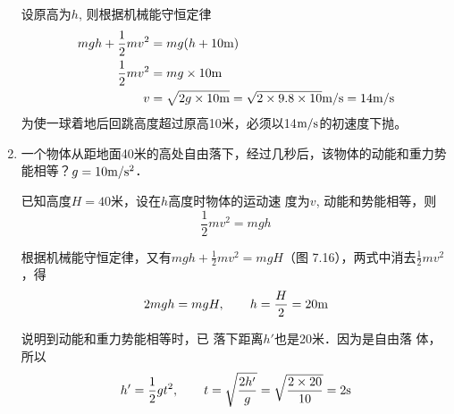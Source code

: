 \begin{enumerate}
\begin{solution}
    设原高为$h$, 则根据机械能守恒定律
   \[\begin{split}
       mgh+\frac{1}{2}mv^2&=mg(h+10{\rm m})\\
\frac{1}{2}mv^2&=mg\times 10{\rm m}\\
v&=\sqrt{2g\times 10{\rm m}}=\sqrt{2\times 9.8\times 10}\text{m}/\text{s}=14\text{m}/\text{s}
   \end{split} \]
    为使一球着地后回跳高度超过原高10米，必须以14$\text{m}/\text{s}$的初速度下抛。
\end{solution}
\item 一个物体从距地面40米的高处自由落下，经过几秒后，该物体的动能和重力势能相等？$g=10\text{m}/\text{s}^2$．

\begin{solution}
    已知高度$H=40$米，设在$h$高度时物体的运动速
    度为$v$, 动能和势能相等，则
    \[\frac{1}{2}mv^2=mgh\]

    根据机械能守恒定律，又有$mgh+\frac{1}{2}mv^2=mgH$（图
7.16），两式中消去$\frac{1}{2}mv^2$，得
\[2mgh=mgH,\qquad h=\frac{H}{2}=20{\rm m}\]

说明到动能和重力势能相等时，已
落下距离$h'$也是20米．因为是自由落
体，所以
\[h'=\frac{1}{2}gt^2,\qquad t=\sqrt{\frac{2h'}{g}}=\sqrt{\frac{2\times 20}{10}}=2{\rm s}\]
\end{solution}
\end{enumerate}

\begin{figure}[htp]
    \centering
{}
    \caption{}
\end{figure}


